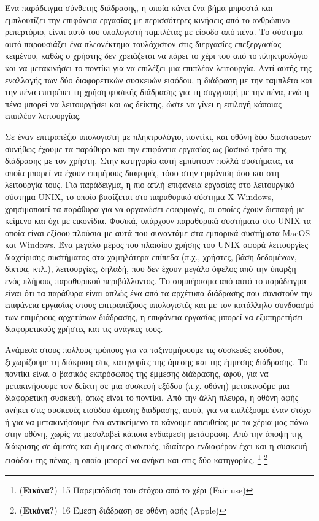 \documentclass[
]{article}
\begin{document}
Ένα παράδειγμα σύνθετης διάδρασης, η οποία κάνει ένα βήμα μπροστά και
εμπλουτίζει την επιφάνεια εργασίας με περισσότερες κινήσεις από το
ανθρώπινο ρεπερτόριο, είναι αυτό του υπολογιστή ταμπλέτας με είσοδο από
πένα. Το σύστημα αυτό παρουσιάζει ένα πλεονέκτημα τουλάχιστον στις
διεργασίες επεξεργασίας κειμένου, καθώς ο χρήστης δεν χρειάζεται να
πάρει το χέρι του από το πληκτρολόγιο και να μετακινήσει το ποντίκι για
να επιλέξει μια επιπλέον λειτουργία. Αντί αυτής της εναλλαγής των δύο
διαφορετικών συσκευών εισόδου, η διάδραση με την ταμπλέτα και την πένα
επιτρέπει τη χρήση φυσικής διάδρασης για τη συγγραφή με την πένα, ενώ η
πένα μπορεί να λειτουργήσει και ως δείκτης, ώστε να γίνει η επιλογή
κάποιας επιπλέον λειτουργίας.

Σε έναν επιτραπέζιο υπολογιστή με πληκτρολόγιο, ποντίκι, και οθόνη δύο
διαστάσεων συνήθως έχουμε τα παράθυρα και την επιφάνεια εργασίας ως
βασικό τρόπο της διάδρασης με τον χρήστη. Στην κατηγορία αυτή εμπίπτουν
πολλά συστήματα, τα οποία μπορεί να έχουν επιμέρους διαφορές, τόσο στην
εμφάνιση όσο και στη λειτουργία τους. Για παράδειγμα, η πιο απλή
επιφάνεια εργασίας στο λειτουργικό σύστημα UNIX, το οποίο βασίζεται στο
παραθυρικό σύστημα X-Windows, χρησιμοποιεί τα παράθυρα για να οργανώσει
εφαρμογές, οι οποίες έχουν διεπαφή με κείμενο και όχι με εικονίδια.
Φυσικά, υπάρχουν παραθυρικά συστήματα στο UNIX τα οποία είναι εξίσου
πλούσια με αυτά που συναντάμε στα εμπορικά συστήματα MacOS και Windows.
Ένα μεγάλο μέρος του πλαισίου χρήσης του UNIX αφορά λειτουργίες
διαχείρισης συστήματος στα χαμηλότερα επίπεδα (π.χ., χρήστες, βάση
δεδομένων, δίκτυα, κτλ.), λειτουργίες, δηλαδή, που δεν έχουν μεγάλο
όφελος από την ύπαρξη ενός πλήρους παραθυρικού περιβάλλοντος. Το
συμπέρασμα από αυτό το παράδειγμα είναι ότι τα παράθυρα είναι απλώς ένα
από τα αρχέτυπα διάδρασης που συνιστούν την επιφάνεια εργασίας στους
επιτραπέζιους υπολογιστές και με τον κατάλληλο συνδυασμό των επιμέρους
αρχετύπων διάδρασης, η επιφάνεια εργασίας μπορεί να εξυπηρετήσει
διαφορετικούς χρήστες και τις ανάγκες τους.

Ανάμεσα στους πολλούς τρόπους για να ταξινομήσουμε τις συσκευές εισόδου,
ξεχωρίζουμε τη διάκριση στις κατηγορίες της άμεσης και της έμμεσης
διάδρασης. Το ποντίκι είναι ο βασικός εκπρόσωπος της έμμεσης διάδρασης,
αφού, για να μετακινήσουμε τον δείκτη σε μια συσκευή εξόδου (π.χ. οθόνη)
μετακινούμε μια διαφορετική συσκευή, όπως είναι το ποντίκι. Από την άλλη
πλευρά, η οθόνη αφής ανήκει στις συσκευές εισόδου άμεσης διάδρασης,
αφού, για να επιλέξουμε έναν στόχο ή για να μετακινήσουμε ένα
αντικείμενο το κάνουμε απευθείας με τα χέρια μας πάνω στην οθόνη, χωρίς
να μεσολαβεί κάποια ενδιάμεση μετάφραση. Από την άποψη της διάκρισης σε
άμεσες και έμμεσες συσκευές, ιδιαίτερο ενδιαφέρον έχει και η συσκευή
εισόδου της πένας, η οποία μπορεί να ανήκει και στις δύο κατηγορίες.
\footnote{(\textbf{Εικόνα?})~15 Παρεμπόδιση του στόχου από το χέρι (Fair
  use)} \footnote{(\textbf{Εικόνα?})~16 Έμεση διάδραση σε οθόνη αφής
  (Apple)}
\end{document}
